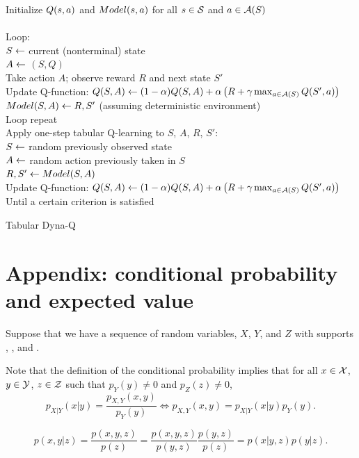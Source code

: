 \begin{table}
\beginalg
Initialize $Q(s,a)$ and $Model(s,a)$ for all $s\in\mathcal{S}$ and $a\in\mathcal{A}(S)$\\
\\
Loop:\\
\> $S \leftarrow$ current (nonterminal) state\\
\> $A \leftarrow$ \epsgreedy$(S,Q)$ \\
\> Take action $A$; observe reward $R$ and next state $S'$\\
\> Update Q-function: $Q(S,A) \leftarrow (1-\alpha) Q(S,A) + \alpha \left( R + \gamma \max_{a\in\mathcal{A}(S)}Q(S',a)\right)$\\
\> $Model(S,A) \leftarrow R, S'$ (assuming deterministic environment)\\
\> Loop repeat\\
\> Apply one-step tabular Q-learning to $S$, $A$, $R$, $S'$:\\
\> \> $S \leftarrow$ random previously observed state\\
\> \> $A \leftarrow$ random action previously taken in $S$\\
\> \> $R, S' \leftarrow Model(S,A)$\\
\> \> Update Q-function: $Q(S,A) \leftarrow (1-\alpha) Q(S,A) + \alpha \left( R + \gamma \max_{a\in\mathcal{A}(S)}Q(S',a) \right)$\\
Until a certain criterion is satisfied
\endalg
\caption{Tabular Dyna-Q}
\label{tab:alg:tabular-dyna-q}
\end{table}




\newpage
\section{Appendix: conditional probability and expected value}
\label{sec:rl-app}


Suppose that we have a sequence of random variables, $X$, $Y$, and $Z$
with supports \suppx, \suppy, and \suppz.

Note that the definition of the conditional probability implies that
for all $x\in\mathcal{X}$, $y\in\mathcal{Y}$, $z\in\mathcal{Z}$ such that $p_Y(y)\neq0$ and $p_Z(z)\neq 0$,
\begin{equation}
\label{eq:vusg-1}
p_{X|Y}(x|y)
= \frac{p_{X,Y}(x,y)}{p_Y(y)}
\Leftrightarrow
p_{X,Y}(x,y) = p_{X|Y}(x|y) p_Y(y).
\end{equation}


\begin{equation}
\label{eq:vusg-2}
p(x,y|z)
= \frac{p(x,y,z)}{p(z)}
= \frac{p(x,y,z)}{p(y,z)} \frac{p(y,z)}{p(z)}
= p(x|y,z) p(y|z).
\end{equation}

